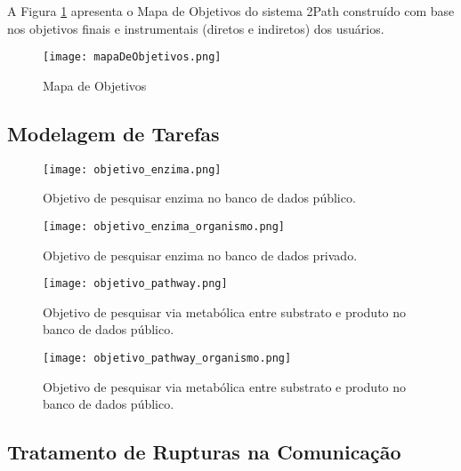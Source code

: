 \indent A Figura \ref{fig:mapaDeObjetivos} apresenta o Mapa de Objetivos do sistema 2Path construído com base nos objetivos finais e instrumentais (diretos e indiretos) dos usuários. 

\begin{figure}[!h]
    \centering
    \texttt{[image: mapaDeObjetivos.png]}
    \caption{Mapa de Objetivos}
    \label{fig:mapaDeObjetivos}
\end{figure} 

\subsection{Modelagem de Tarefas}

\begin{figure}[!h]
    \centering
    \texttt{[image: objetivo\_enzima.png]}
    \caption{Objetivo de pesquisar enzima no banco de dados público.}
    \label{fig:objetivo_enzyma}
\end{figure}

\begin{figure}[!h]
    \centering
    \texttt{[image: objetivo\_enzima\_organismo.png]}
    \caption{Objetivo de pesquisar enzima no banco de dados privado.}
    \label{fig:objetivo_enzyma_organismo}
\end{figure}

\begin{figure}[!h]
    \centering
    \texttt{[image: objetivo\_pathway.png]}
    \caption{Objetivo de pesquisar via metabólica entre substrato e produto no banco de dados público.}
    \label{fig:objetivo_pathway}
\end{figure}

\begin{figure}[!h]
    \centering
    \texttt{[image: objetivo\_pathway\_organismo.png]}
    \caption{Objetivo de pesquisar via metabólica entre substrato e produto no banco de dados público.}
    \label{fig:objetivo_pathway_organismo}
\end{figure}

\subsection{Tratamento de Rupturas na Comunicação}

